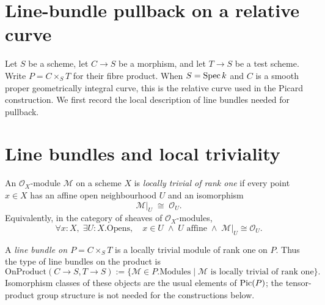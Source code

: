\section{Line-bundle pullback on a relative curve}
\label{mk-chap:Picard_LineBundlePullback}

Let $S$ be a scheme, let $C \to S$ be a morphism, and let $T \to S$ be a
test scheme.  Write $P=C\times_S T$ for their fibre product.  When $S=\operatorname{Spec} k$
and $C$ is a smooth proper geometrically integral curve, this is the relative
curve used in the Picard construction.  We first record the local description
of line bundles needed for pullback.

\section{Line bundles and local triviality}
\label{mk-sec:lbp_line_bundle}

\begin{definition}\label{mk-def:IsLocallyTrivial}
  \leanok

  An $\mathcal O_X$-module $\mathcal M$ on a scheme $X$ is \emph{locally
  trivial of rank one} if every point $x\in X$ has an affine open
  neighbourhood $U$ and an isomorphism
  \[
    \mathcal M|_U \;\cong\; \mathcal O_U.
  \]
  Equivalently, in the category of sheaves of $\mathcal O_X$-modules,
  \[
    \forall x:X,\;\exists U:X.\mathrm{Opens},\quad
    x\in U\;\wedge\;U\text{ affine}\;\wedge\;
    \mathcal M|_U\cong\mathcal O_U.
  \]
\end{definition}

\begin{definition}\label{mk-def:line_bundle_on_product}
  \leanok

  A \emph{line bundle on $P=C\times_S T$} is a locally trivial module of rank
  one on $P$.  Thus the type of line bundles on the product is
  \[
    \mathrm{OnProduct}(C\to S,T\to S)
    :=\{\mathcal M\in P.\mathrm{Modules}\mid
          \mathcal M\text{ is locally trivial of rank one}\}.
  \]
  Isomorphism classes of these objects are the usual elements of
  $\operatorname{Pic}(P)$; the tensor-product group structure is not needed for the
  constructions below.
\end{definition}

